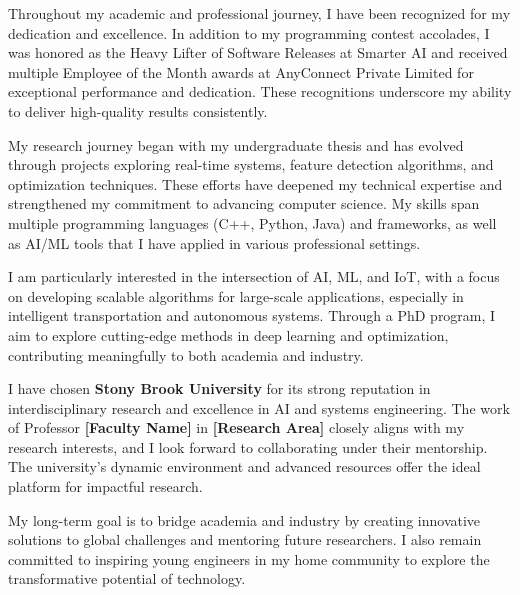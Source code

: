 \documentclass[11pt]{article}
\newif\ifshowsections
\begin{document}
Throughout my academic and professional journey, I have been recognized for my dedication and excellence.
In addition to my programming contest accolades, I was honored as the Heavy Lifter of Software Releases at
Smarter AI and received multiple Employee of the Month awards at AnyConnect Private Limited for exceptional
performance and dedication. These recognitions underscore my ability to deliver high-quality results consistently.

\ifshowsections\section*{Research Interests}\fi

My research journey began with my undergraduate thesis and has evolved through projects exploring real-time
systems, feature detection algorithms, and optimization techniques. These efforts have deepened my technical
expertise and strengthened my commitment to advancing computer science. My skills span multiple programming
languages (C++, Python, Java) and frameworks, as well as AI/ML tools that I have applied in various professional
settings.

I am particularly interested in the intersection of AI, ML, and IoT, with a focus on developing scalable algorithms
for large-scale applications, especially in intelligent transportation and autonomous systems. Through a PhD program,
I aim to explore cutting-edge methods in deep learning and optimization, contributing meaningfully to both academia
and industry.

\ifshowsections\section*{Motivation and Future Goals}\fi

I have chosen \textbf{Stony Brook University} for its strong reputation in interdisciplinary research and excellence
in AI and systems engineering. The work of Professor \textbf{[Faculty Name]} in \textbf{[Research Area]} closely aligns
with my research interests, and I look forward to collaborating under their mentorship. The university’s dynamic
environment and advanced resources offer the ideal platform for impactful research.

My long-term goal is to bridge academia and industry by creating innovative solutions to global challenges and
mentoring future researchers. I also remain committed to inspiring young engineers in my home community to explore
the transformative potential of technology.
\end{document}
